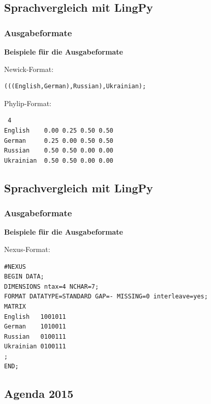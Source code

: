 \subsection{\texorpdfstring{{Sprachvergleich mit
LingPy}}{Sprachvergleich mit LingPy}}

\subsubsection{\texorpdfstring{{Ausgabeformate}}{Ausgabeformate}}

\textbf{Beispiele für die Ausgabeformate}

Newick-Format:

\begin{verbatim}
(((English,German),Russian),Ukrainian);
\end{verbatim}

Phylip-Format:

\begin{verbatim}
 4
English    0.00 0.25 0.50 0.50
German     0.25 0.00 0.50 0.50
Russian    0.50 0.50 0.00 0.00
Ukrainian  0.50 0.50 0.00 0.00
\end{verbatim}

\subsection{\texorpdfstring{{Sprachvergleich mit
LingPy}}{Sprachvergleich mit LingPy}}

\subsubsection{\texorpdfstring{{Ausgabeformate}}{Ausgabeformate}}

\textbf{Beispiele für die Ausgabeformate}

Nexus-Format:

\begin{verbatim}
#NEXUS
BEGIN DATA;
DIMENSIONS ntax=4 NCHAR=7;
FORMAT DATATYPE=STANDARD GAP=- MISSING=0 interleave=yes;
MATRIX
English   1001011
German    1010011
Russian   0100111
Ukrainian 0100111
;
END;
\end{verbatim}

\subsection{\texorpdfstring{{Agenda 2015}}{Agenda 2015}}

